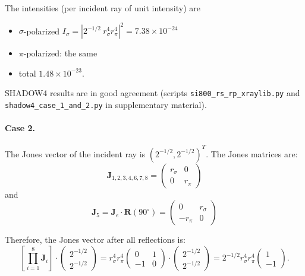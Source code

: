 \documentclass{iucr}
\begin{document}
The intensities (per incident ray of unit intensity) are
\begin{itemize}
    \item $\sigma$-polarized $I_\sigma=|2^{-1/2}~r_\sigma^4 r_\pi^4|^2=7.38\times10^{-24}$
    \item $\pi$-polarized: the same
    \item total $1.48\times10^{-23}$.
\end{itemize}
SHADOW4 results are in good agreement (scripts {\tt si800\_rs\_rp\_xraylib.py} and {\tt shadow4\_case\_1\_and\_2.py} in supplementary material).

\paragraph{Case 2.}

The Jones vector of the incident ray is $(2^{-1/2},2^{-1/2})^T$.
The Jones matrices are: 
\begin{equation}\label{eq:Jcase2_S4}
\textbf{J}_{1,2,3,4,6,7,8}=
    \begin{pmatrix}
r_\sigma & 0\\
0& 
r_\pi
\end{pmatrix}
\end{equation}
and
\begin{equation}\label{eq:J5case2_S4}
\textbf{J}_{5}=\textbf{J}_e \cdot \textbf{R}(90^\circ)=
\begin{pmatrix}
0 & r_\sigma\\
-r_\pi& 0
\end{pmatrix}
\end{equation}

Therefore, the Jones vector after all reflections is:
\begin{equation}\label{eq:JVcase2_S4}
\left[ \prod_{i=1}^{8} \textbf{J}_i \right]
    \cdot
    \begin{pmatrix}
    2^{-1/2}\\2^{-1/2}
    \end{pmatrix}=
    r_\sigma^4 r_\pi^4
        \begin{pmatrix}
    0&1\\
    -1 & 0
    \end{pmatrix}
    \cdot
        \begin{pmatrix}
    2^{-1/2}\\2^{-1/2}
    \end{pmatrix}
    =
    2^{-1/2}r_\sigma^4 r_\pi^4
    \begin{pmatrix}
    1\\
    -1
    \end{pmatrix}.
\end{equation}
\end{document}
